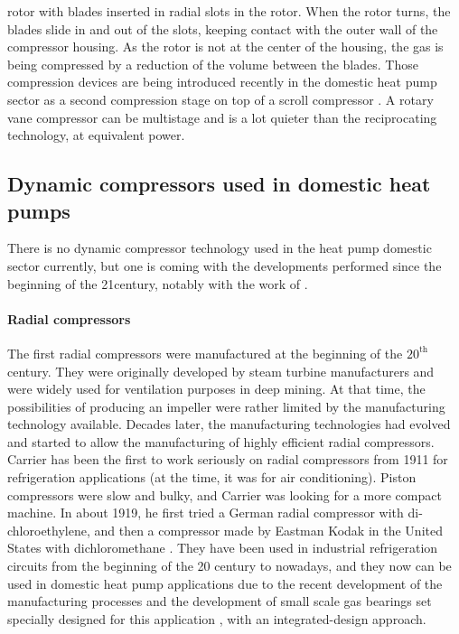 \begin{description}
  rotor with blades inserted in radial slots in the rotor. When the
  rotor turns, the blades slide in and out of the slots, keeping
  contact with the outer wall of the compressor housing. As the rotor
  is not at the center of the housing, the gas is being compressed by
  a reduction of the volume between the blades. Those compression
  devices are being introduced recently in the domestic heat pump
  sector as a second compression stage on top of a scroll compressor
  \citep{Kondo-Kimata-2010a,Mitsubishi-2011a,Sato-Kobayashi-2012a}. A
  rotary vane compressor can be multistage and is a lot quieter than
  the reciprocating technology, at equivalent power.
\end{description}

\subsection{Dynamic compressors used in domestic
  heat pumps}
\label{sec:sota-dyn-cp}

There is no dynamic compressor technology used in the heat pump
domestic sector currently, but one is coming with the developments
performed since the beginning of the 21\th century, notably with the
work of \citet{schiffmann-2008a}.

\paragraph{Radial compressors}

The first radial compressors were manufactured at the beginning of the
$20^{\text{th}}$ century. They were originally developed by steam
turbine manufacturers and were widely used for ventilation purposes in
deep mining. At that time, the possibilities of producing an impeller
were rather limited by the manufacturing technology available. Decades
later, the manufacturing technologies had evolved and started to allow
the manufacturing of highly efficient radial compressors. Carrier has
been the first to work seriously on radial compressors from 1911 for
refrigeration applications (at the time, it was for air
conditioning). Piston compressors were slow and bulky, and Carrier was
looking for a more compact machine. In about 1919, he first tried a
German radial compressor with di-chloroethylene, and then a compressor
made by Eastman Kodak in the United States with dichloromethane
\citep[p.\,16]{zogg-2008a}. They have been used in industrial
refrigeration circuits from the beginning of the 20\th{} century to
nowadays, and they now can be used in domestic heat pump applications
due to the recent development of the manufacturing processes and the
development of small scale gas bearings set specially designed for
this application \citep{schiffmann-2008a}, with an integrated-design
approach.

